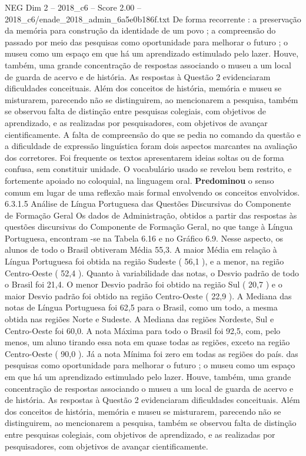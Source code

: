 \begin{textsample}{NEG Dim 2 – 2018\_c6 – Score 2.00 – 2018\_c6/enade\_2018\_admin\_6a5e0b186f.txt}
De forma recorrente : a preservação da memória para construção da identidade de um povo ; a compreensão do passado por meio das pesquisas como oportunidade para melhorar o futuro ; o museu como um espaço em que há um aprendizado estimulado pelo lazer.
Houve, também, uma grande concentração de respostas associando o museu a um local de guarda de acervo e de história.
As respostas à Questão 2 evidenciaram dificuldades conceituais.
Além dos conceitos de história, memória e museu se misturarem, parecendo não se distinguirem, ao mencionarem a pesquisa, também se observou falta de distinção entre pesquisas colegiais, com objetivos de aprendizado, e as realizadas por pesquisadores, com objetivos de avançar cientificamente.
A falta de compreensão do que se pedia no comando da questão e a dificuldade de expressão linguística foram dois aspectos marcantes na avaliação dos corretores.
Foi frequente os textos apresentarem ideias soltas ou de forma confusa, sem constituir unidade.
O vocabulário usado se revelou bem restrito, e fortemente apoiado no coloquial, na linguagem oral. \textbf{Predominou} o senso comum em lugar de uma reflexão mais formal envolvendo os conceitos envolvidos. 6.3.1.5 Análise de Língua Portuguesa das Questões Discursivas do Componente de Formação Geral Os dados de Administração, obtidos a partir das respostas às questões discursivas do Componente de Formação Geral, no que tange à Língua Portuguesa, encontram -se na Tabela 6.16 e no Gráfico 6.9.
Nesse aspecto, os alunos de todo o Brasil obtiveram Média 55,3.
A maior Média em relação à Língua Portuguesa foi obtida na região Sudeste ( 56,1 ), e a menor, na região Centro-Oeste ( 52,4 ).
Quanto à variabilidade das notas, o Desvio padrão de todo o Brasil foi 21,4.
O menor Desvio padrão foi obtido na região Sul ( 20,7 ) e o maior Desvio padrão foi obtido na região Centro-Oeste ( 22,9 ).
A Mediana das notas de Língua Portuguesa foi 62,5 para o Brasil, como um todo, a mesma obtida nas regiões Norte e Sudeste.
A Mediana das regiões Nordeste, Sul e Centro-Oeste foi 60,0.
A nota Máxima para todo o Brasil foi 92,5, com, pelo menos, um aluno tirando essa nota em quase todas as regiões, exceto na região Centro-Oeste ( 90,0 ).
Já a nota Mínima foi zero em todas as regiões do país. das pesquisas como oportunidade para melhorar o futuro ; o museu como um espaço em que há um aprendizado estimulado pelo lazer.
Houve, também, uma grande concentração de respostas associando o museu a um local de guarda de acervo e de história.
As respostas à Questão 2 evidenciaram dificuldades conceituais.
Além dos conceitos de história, memória e museu se misturarem, parecendo não se distinguirem, ao mencionarem a pesquisa, também se observou falta de distinção entre pesquisas colegiais, com objetivos de aprendizado, e as realizadas por pesquisadores, com objetivos de avançar cientificamente.

\end{textsample}

